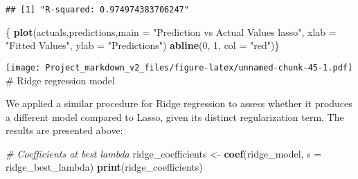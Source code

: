 \documentclass[
]{article}
\newenvironment{Shaded}{\begin{snugshade}}{\end{snugshade}}
\newcommand{\AttributeTok}[1]{\textcolor[rgb]{0.13,0.29,0.53}{#1}}
\newcommand{\CommentTok}[1]{\textcolor[rgb]{0.56,0.35,0.01}{\textit{#1}}}
\newcommand{\DecValTok}[1]{\textcolor[rgb]{0.00,0.00,0.81}{#1}}
\newcommand{\FunctionTok}[1]{\textcolor[rgb]{0.13,0.29,0.53}{\textbf{#1}}}
\newcommand{\NormalTok}[1]{#1}
\newcommand{\OtherTok}[1]{\textcolor[rgb]{0.56,0.35,0.01}{#1}}
\newcommand{\SpecialCharTok}[1]{\textcolor[rgb]{0.81,0.36,0.00}{\textbf{#1}}}
\newcommand{\StringTok}[1]{\textcolor[rgb]{0.31,0.60,0.02}{#1}}
\begin{document}
\begin{verbatim}
## [1] "R-squared: 0.974974383706247"
\end{verbatim}

\begin{Shaded}
\begin{Highlighting}[]
\NormalTok{\{}
\FunctionTok{plot}\NormalTok{(actuals,predictions,}\AttributeTok{main =} \StringTok{"Prediction vs Actual Values lasso"}\NormalTok{,}
     \AttributeTok{xlab =} \StringTok{"Fitted Values"}\NormalTok{, }\AttributeTok{ylab =} \StringTok{"Predictions"}\NormalTok{)}
\FunctionTok{abline}\NormalTok{(}\DecValTok{0}\NormalTok{, }\DecValTok{1}\NormalTok{, }\AttributeTok{col =} \StringTok{"red"}\NormalTok{)\}}
\end{Highlighting}
\end{Shaded}

\texttt{[image: Project\_markdown\_v2\_files/figure-latex/unnamed-chunk-45-1.pdf]}
\# Ridge regression model

We applied a similar procedure for Ridge regression to assess whether it
produces a different model compared to Lasso, given its distinct
regularization term. The results are presented above:

\begin{Shaded}
\end{Shaded}

\begin{Shaded}
\begin{Highlighting}[]
\CommentTok{\# Coefficients at best lambda}
\NormalTok{ridge\_coefficients }\OtherTok{\textless{}{-}} \FunctionTok{coef}\NormalTok{(ridge\_model, }\AttributeTok{s =}\NormalTok{ ridge\_best\_lambda)}
\FunctionTok{print}\NormalTok{(ridge\_coefficients)}
\end{Highlighting}
\end{Shaded}
\end{document}
